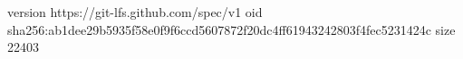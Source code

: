 version https://git-lfs.github.com/spec/v1
oid sha256:ab1dee29b5935f58e0f9f6ccd5607872f20dc4ff61943242803f4fec5231424c
size 22403

